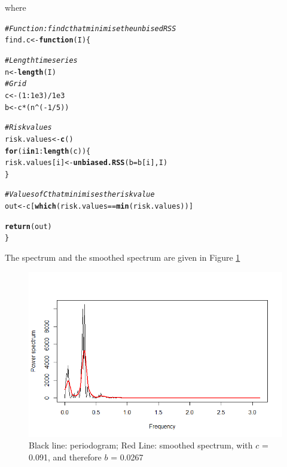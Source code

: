 \documentclass{article}\usepackage[]{graphicx}\usepackage[]{color}
\makeatletter
\newcommand{\hlnum}[1]{\textcolor[rgb]{0.686,0.059,0.569}{#1}}%
\newcommand{\hlcom}[1]{\textcolor[rgb]{0.678,0.584,0.686}{\textit{#1}}}%
\newcommand{\hlopt}[1]{\textcolor[rgb]{0,0,0}{#1}}%
\newcommand{\hlstd}[1]{\textcolor[rgb]{0.345,0.345,0.345}{#1}}%
\newcommand{\hlkwa}[1]{\textcolor[rgb]{0.161,0.373,0.58}{\textbf{#1}}}%
\newcommand{\hlkwb}[1]{\textcolor[rgb]{0.69,0.353,0.396}{#1}}%
\newcommand{\hlkwc}[1]{\textcolor[rgb]{0.333,0.667,0.333}{#1}}%
\newcommand{\hlkwd}[1]{\textcolor[rgb]{0.737,0.353,0.396}{\textbf{#1}}}%
\newenvironment{kframe}{%
 \def\at@end@of@kframe{}%
 \ifinner\ifhmode%
  \def\at@end@of@kframe{\end{minipage}}%
  \begin{minipage}{\columnwidth}%
 \fi\fi%
 \def\FrameCommand##1{\hskip\@totalleftmargin \hskip-\fboxsep
 \colorbox{shadecolor}{##1}\hskip-\fboxsep
     \hskip-\linewidth \hskip-\@totalleftmargin \hskip\columnwidth}%
 \MakeFramed {\advance\hsize-\width
   \@totalleftmargin\z@ \linewidth\hsize
   \@setminipage}}%
 {\par\unskip\endMakeFramed%
 \at@end@of@kframe}
\newenvironment{knitrout}{}{} %
\makeatother
\begin{document}
where

\begin{knitrout}\footnotesize
{}\color{fgcolor}\begin{kframe}
\begin{alltt}
\hlcom{# Function: find c that minimise the unbised RSS}
\hlstd{find.c} \hlkwb{<-} \hlkwa{function}\hlstd{(}\hlkwc{I}\hlstd{) \{}

  \hlcom{# Length time series}
  \hlstd{n} \hlkwb{<-} \hlkwd{length}\hlstd{(I)}
  \hlcom{# Grid}
  \hlstd{c} \hlkwb{<-} \hlstd{(}\hlnum{1}\hlopt{:}\hlnum{1e3}\hlstd{)}\hlopt{/}\hlnum{1e3}
  \hlstd{b} \hlkwb{<-} \hlstd{c} \hlopt{*} \hlstd{(n}\hlopt{^}\hlstd{(}\hlopt{-}\hlnum{1}\hlopt{/}\hlnum{5}\hlstd{))}

  \hlcom{# Risk values}
  \hlstd{risk.values} \hlkwb{<-} \hlkwd{c}\hlstd{()}
  \hlkwa{for}\hlstd{(i} \hlkwa{in} \hlnum{1}\hlopt{:}\hlkwd{length}\hlstd{(c)) \{}
    \hlstd{risk.values[i]} \hlkwb{<-} \hlkwd{unbiased.RSS}\hlstd{(}\hlkwc{b} \hlstd{= b[i], I)}
  \hlstd{\}}

  \hlcom{# Values of C that minimises the risk value}
  \hlstd{out} \hlkwb{<-} \hlstd{c[}\hlkwd{which}\hlstd{(risk.values} \hlopt{==} \hlkwd{min}\hlstd{(risk.values))]}

  \hlkwd{return}\hlstd{(out)}
\hlstd{\}}
\end{alltt}
\end{kframe}
\end{knitrout}

The spectrum and the smoothed spectrum are given in Figure \ref{fig:spectrum_vs_smoothing}

\begin{figure}[htbp]
\centering
\includegraphics[scale = 0.4]{Plots/period_vs_smoothing.png}
\caption{Black line: periodogram; Red Line: smoothed spectrum, with $c$ = 0.091, and therefore $b$ = 0.0267}
\label{fig:spectrum_vs_smoothing}
\end{figure}
\end{document}
